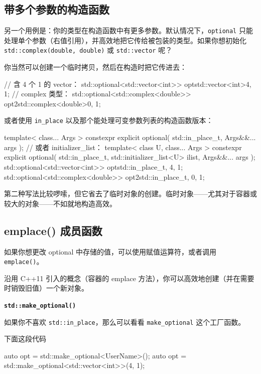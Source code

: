 \subsection{带多个参数的构造函数}

另一个用例是：你的类型在构造函数中有更多参数。默认情况下，\texttt{optional} 只能处理单个参数（右值引用），并高效地把它传给被包装的类型。如果你想初始化 \texttt{std::complex(double, double)} 或 \texttt{std::vector} 呢？

你当然可以创建一个临时拷贝，然后在构造时把它传进去：

\begin{codebox}[cpp]
// 含 4 个 1 的 vector：
std::optional<std::vector<int>> opt{std::vector<int>{4, 1}};
// complex 类型：
std::optional<std::complex<double>> opt2{std::complex<double>{0, 1}};
\end{codebox}

或者使用 \texttt{in\_place} 以及那个能处理可变参数列表的构造函数版本：

\begin{codebox}[cpp]
template< class... Args >
constexpr explicit optional( std::in_place_t, Args&&... args );
// 或者 initializer_list：
template< class U, class... Args >
constexpr explicit optional( std::in_place_t,
std::initializer_list<U> ilist,
Args&&... args );
std::optional<std::vector<int>> opt{std::in_place_t, 4, 1};
std::optional<std::complex<double>> opt2{std::in_place_t, 0, 1};
\end{codebox}

第二种写法比较啰嗦，但它省去了临时对象的创建。临时对象——尤其对于容器或较大的对象——不如就地构造高效。

\subsection{emplace() 成员函数}

如果你想更改 optional 中存储的值，可以使用赋值运算符，或者调用 \texttt{emplace()}。

沿用 C++11 引入的概念（容器的 emplace 方法），你可以高效地创建（并在需要时销毁旧值）一个新对象。

\textbf{\texttt{std::make\_optional()}}

如果你不喜欢 \texttt{std::in\_place}，那么可以看看 \texttt{make\_optional} 这个工厂函数。

下面这段代码

\begin{codebox}[cpp]
auto opt = std::make_optional<UserName>();
auto opt = std::make_optional<std::vector<int>>(4, 1);
\end{codebox}

